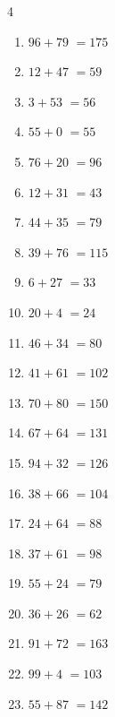 \begin{multicols}{4}
\begin{enumerate}
  \item $96+79$
        $=175$

  \item $12+47$
        $=59$

  \item $3+53$
        $=56$

  \item $55+0$
        $=55$

  \item $76+20$
        $=96$

  \item $12+31$
        $=43$

  \item $44+35$
        $=79$

  \item $39+76$
        $=115$

  \item $6+27$
        $=33$

  \item $20+4$
        $=24$

  \item $46+34$
        $=80$

  \item $41+61$
        $=102$

  \item $70+80$
        $=150$

  \item $67+64$
        $=131$

  \item $94+32$
        $=126$

  \item $38+66$
        $=104$

\columnbreak %

\resetques

  \item $24+64$
        $=88$

  \item $37+61$
        $=98$

  \item $55+24$
        $=79$

  \item $36+26$
        $=62$

  \item $91+72$
        $=163$

  \item $99+4$
        $=103$

  \item $55+87$
        $=142$


\end{enumerate}
\end{multicols}
